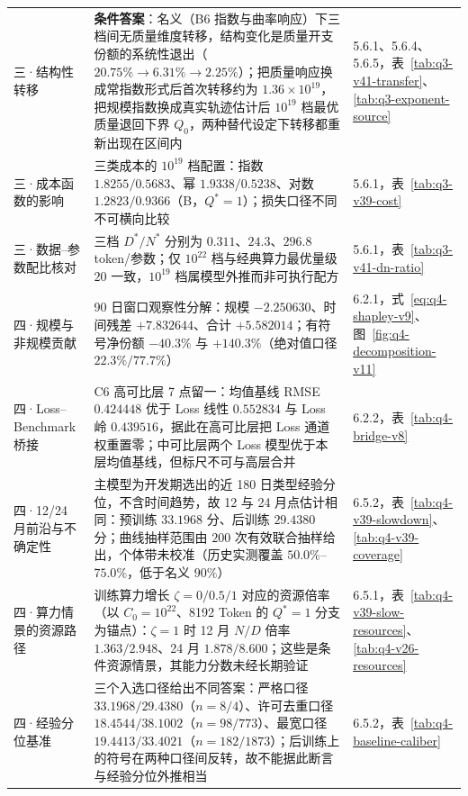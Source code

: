 \begin{table}[H]
\begin{tabular}{P{3.8cm}P{8.9cm}P{2.2cm}}
三·结构性转移 & \textbf{条件答案}：名义（B6 指数与曲率响应）下三档间无质量维度转移，结构变化是质量开支份额的系统性退出（$20.75\%\to6.31\%\to2.25\%$）；把质量响应换成常指数形式后首次转移约为 $1.36\times10^{19}$，把规模指数换成真实轨迹估计后 $10^{19}$ 档最优质量退回下界 $Q_0$，两种替代设定下转移都重新出现在区间内 & 5.6.1、5.6.4、5.6.5，表~\ref{tab:q3-v41-transfer}、\ref{tab:q3-exponent-source}\\
三·成本函数的影响 & 三类成本的 $10^{19}$ 档配置：指数 $1.8255/0.5683$、幂 $1.9338/0.5238$、对数 $1.2823/0.9366$（B，$Q^*=1$）；损失口径不同不可横向比较 & 5.6.1，表~\ref{tab:q3-v39-cost}\\
三·数据--参数配比核对 & 三档 $D^*/N^*$ 分别为 $0.311$、$24.3$、$296.8$ token/参数；仅 $10^{22}$ 档与经典算力最优量级 $20$ 一致，$10^{19}$ 档属模型外推而非可执行配方 & 5.6.1，表~\ref{tab:q3-v41-dn-ratio}\\
四·规模与非规模贡献 & 90 日窗口观察性分解：规模 $-2.250630$、时间残差 $+7.832644$、合计 $+5.582014$；有符号净份额 $-40.3\%$ 与 $+140.3\%$（绝对值口径 $22.3\%/77.7\%$） & 6.2.1，式~\eqref{eq:q4-shapley-v9}、图~\ref{fig:q4-decomposition-v11}\\
四·Loss--Benchmark 桥接 & C6 高可比层 7 点留一：均值基线 RMSE $0.424448$ 优于 Loss 线性 $0.552834$ 与 Loss 岭 $0.439516$，据此在高可比层把 Loss 通道权重置零；中可比层两个 Loss 模型优于本层均值基线，但标尺不可与高层合并 & 6.2.2，表~\ref{tab:q4-bridge-v8}\\
四·12/24 月前沿与不确定性                          & 主模型为开发期选出的近 180 日类型经验分位，不含时间趋势，故 12 与 24 月点估计相同：预训练 $33.1968$ 分、后训练 $29.4380$ 分；曲线抽样范围由 $200$ 次有效联合抽样给出，个体带未校准（历史实测覆盖 $50.0\%$--$75.0\%$，低于名义 $90\%$）                                     & 6.5.2，表~\ref{tab:q4-v39-slowdown}、\ref{tab:q4-v39-coverage}                \\
四·算力情景的资源路径                               & 训练算力增长 $\zeta=0/0.5/1$ 对应的资源倍率（以 $C_0=10^{22}$、8192 Token 的 $Q^*=1$ 分支为锚点）：$\zeta=1$ 时 12 月 $N/D$ 倍率 $1.363/2.948$、24 月 $1.878/8.600$；这些是条件资源情景，其能力分数未经长期验证                               & 6.5.1，表~\ref{tab:q4-v39-slow-resources}、\ref{tab:q4-v26-resources}         \\
四·经验分位基准 & 三个入选口径给出不同答案：严格口径 $33.1968/29.4380$（$n=8/4$）、许可去重口径 $18.4544/38.1002$（$n=98/773$）、最宽口径 $19.4413/33.4021$（$n=182/1873$）；后训练上的符号在两种口径间反转，故不能据此断言与经验分位外推相当 & 6.5.2，表~\ref{tab:q4-baseline-caliber}\\
\bottomrule
\end{tabular}
\end{table}

\clearpage
